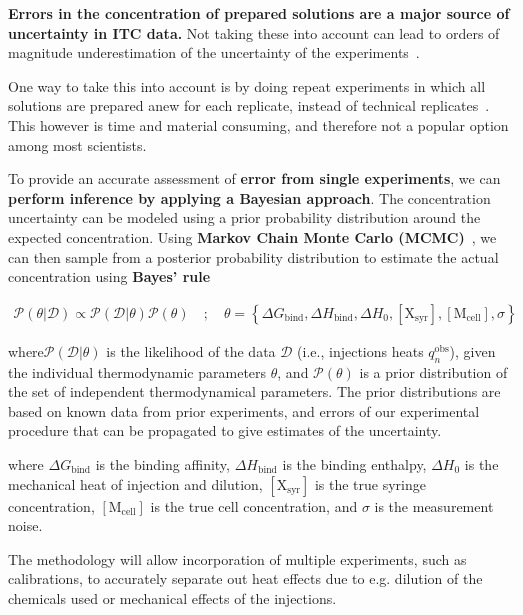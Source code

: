\documentclass[10pt,final]{article}
\begin{document}
\textbf{Errors in the concentration of prepared solutions are a major source of uncertainty in ITC data.} Not taking these into account can lead to orders of magnitude underestimation of the uncertainty of the experiments~\cite{Myszka2003a,Tellinghuisen2011a}.

One way to take this into account is by doing repeat experiments in which all solutions are prepared anew for each replicate, instead of technical replicates~\cite{Vaux2012a}. This however is time and material consuming, and therefore not a popular option among most scientists. 

To provide an accurate assessment of \textbf{error from single experiments}, we can \textbf{perform inference by applying a Bayesian approach}. The concentration uncertainty can be modeled using a prior probability distribution around the expected concentration. Using \textbf{Markov Chain Monte Carlo (MCMC)}~\cite{Metropolis1953a,Hastings1970a}, we can then sample from a posterior probability distribution to estimate the actual concentration using\textbf{ Bayes' rule}

\begin{align}
	\mathcal{P}\left(\theta | \mathcal{D} \right) \propto  \mathcal{P}(\mathcal{D} | \theta) \mathcal{P}\left(\theta\right) \quad;\quad \theta   =  \left\{ \Delta G_\mathrm{bind}, \Delta H_\mathrm{bind}, \Delta H_0, [\mathrm{X_{syr}}], [\mathrm{M_{cell}}], \sigma \right\}
\end{align}

where$\mathcal{P}(\mathcal{D}|\theta)$ is the likelihood of the data $\mathcal{D}$ (i.e., injections heats $q_n^\mathrm{obs}$), given the individual thermodynamic parameters $\theta$, and $\mathcal{P}(\theta)$ is a prior distribution of the set of independent thermodynamical parameters. The prior distributions are based on known data from prior experiments, and errors of our experimental procedure that can be propagated to give estimates of the uncertainty.

where $\Delta G_\mathrm{bind}$ is the binding affinity, $\Delta H_\mathrm{bind}$ is the binding enthalpy, $\Delta H_0$ is the mechanical heat of injection and dilution, $[\mathrm{X_{syr}}]$ is the true syringe concentration, $[\mathrm{M_{cell}}]$ is the true cell concentration, and $\sigma$ is the measurement noise.



The methodology will allow incorporation of multiple experiments, such as calibrations, to accurately separate out heat effects due to e.g. dilution of the chemicals used or mechanical effects of the injections.
\end{document}

